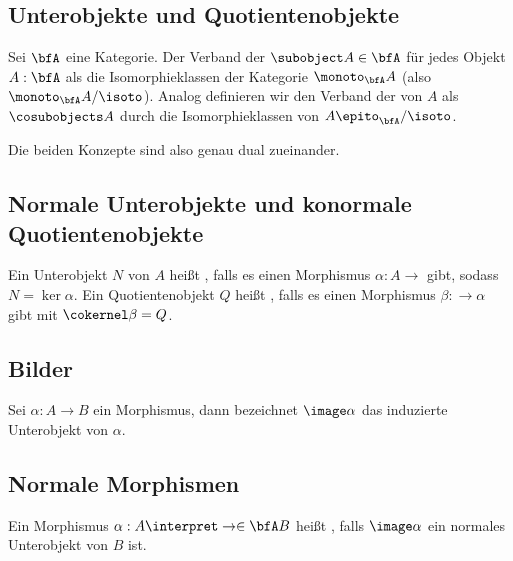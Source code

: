 \subsection{Unterobjekte und Quotientenobjekte}

\begin{definition}
    Sei $\bfA$ eine Kategorie. Der Verband der  $\subobject A\in\bfA$ für jedes Objekt $A:\bfA$ als die
    Isomorphieklassen der Kategorie $\monoto_\bfA A$ (also $\monoto_\bfA A/\isoto$).
    Analog definieren wir den Verband der  von $A$ als $\cosubobjects A$ durch die Isomorphieklassen von $A\epito_\bfA/\isoto$.
\end{definition}

\begin{remark}
    Die beiden Konzepte sind also genau dual zueinander.
\end{remark}

\subsection{Normale Unterobjekte und konormale Quotientenobjekte}

\begin{definition}
        Ein Unterobjekt $N$ von $A$ heißt , falls es einen Morphismus $\alpha:A\to$ gibt, sodass $N=\ker\alpha$.
        Ein Quotientenobjekt $Q$ heißt , falls es einen Morphismus $\beta:\to\alpha$ gibt mit $\cokernel \beta=Q$.
\end{definition}

\subsection{Bilder}

\begin{definition}
    Sei $\alpha:A\to B$ ein Morphismus, dann bezeichnet $\image \alpha$ das induzierte Unterobjekt von $\alpha$.
\end{definition}

\subsection{Normale Morphismen}

\begin{definition}
    Ein Morphismus $\alpha:A\interpret\to\in\bfA B$ heißt , falls $\image\alpha$ ein
    normales Unterobjekt von $B$ ist.
\end{definition}

